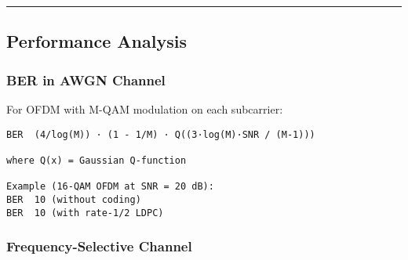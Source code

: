 \begin{center}\rule{0.5\linewidth}{0.5pt}\end{center}

\subsection{\texorpdfstring{ Performance
Analysis}{ Performance Analysis}}\label{performance-analysis}

\subsubsection{BER in AWGN Channel}\label{ber-in-awgn-channel}

For OFDM with M-QAM modulation on each subcarrier:

\begin{verbatim}
BER  (4/log(M)) · (1 - 1/M) · Q((3·log(M)·SNR / (M-1)))

where Q(x) = Gaussian Q-function

Example (16-QAM OFDM at SNR = 20 dB):
BER  10 (without coding)
BER  10 (with rate-1/2 LDPC)
\end{verbatim}

\subsubsection{Frequency-Selective
Channel}\label{frequency-selective-channel}

